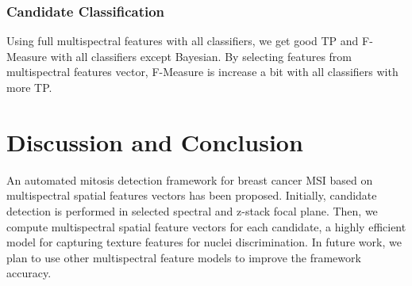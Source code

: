 \documentclass[10pt,twocolumn,letterpaper]{article}
\begin{document}
\subsubsection{Candidate Classification}
Using full multispectral features with all classifiers, we get good TP and F-Measure with all classifiers except Bayesian. By selecting features from multispectral features vector, F-Measure is increase a bit with all classifiers with more TP.  

\section{Discussion and Conclusion}
\label{sec:conclusion}
An automated mitosis detection framework for breast cancer MSI based on multispectral spatial features vectors has been proposed. Initially, candidate detection is performed in selected spectral and z-stack focal plane. Then, we compute multispectral spatial feature vectors for each candidate, a highly efficient model for capturing texture features for nuclei discrimination. In future work, we plan to use other multispectral feature models to improve the framework accuracy. 
{\small


}
\end{document}
